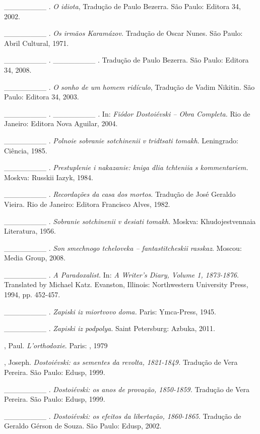 \begin{Parskip}
\_\_\_\_\_\_\_\_ . \emph{O idiota}, Tradução de Paulo Bezerra. São
Paulo: Editora 34, 2002.

\_\_\_\_\_\_\_\_ . \emph{Os irmãos Karamázov}. Tradução de Oscar Nunes.
São Paulo: Abril Cultural, 1971.

\_\_\_\_\_\_\_\_ . \_\_\_\_\_\_\_\_ . Tradução de Paulo Bezerra. São
Paulo: Editora 34, 2008.

\_\_\_\_\_\_\_\_ . \emph{O sonho de um homem ridículo}, Tradução de
Vadim Nikitin. São Paulo: Editora 34, 2003.

\_\_\_\_\_\_\_\_ . \_\_\_\_\_\_\_\_ \emph{.} In: \emph{Fiódor
Dostoiévski -- Obra Completa.} Rio de Janeiro: Editora Nova Aguilar,
2004.

\_\_\_\_\_\_\_\_ . \emph{Polnoie sobranie sotchinenii v tridtsati
tomakh}. Leningrado: Ciência, 1985.

\_\_\_\_\_\_\_\_ . \emph{Prestuplenie i nakazanie: kniga dlia tchteniia
s kommentariem.} Moskva: Russkii Iazyk, 1984.

\_\_\_\_\_\_\_\_ . \emph{Recordações da casa dos mortos}. Tradução de
José Geraldo Vieira. Rio de Janeiro: Editora Francisco Alves, 1982.

\_\_\_\_\_\_\_\_ . \emph{Sobranie sotchinenii v desiati tomakh.} Moskva:
Khudojestvennaia Literatura, 1956.

\_\_\_\_\_\_\_\_ . \emph{Son smechnogo tcheloveka -- fantastitcheskii
rasskaz}. Moscou:  Media Group, 2008.

\_\_\_\_\_\_\_\_ . \emph{A Paradoxalist.} In: \emph{A Writer's Diary,
Volume 1, 1873-1876}. Translated by Michael Katz. Evanston, Illinois:
Northwestern University Press, 1994, pp. 452-457.

\_\_\_\_\_\_\_\_ . \emph{Zapiski iz miortvovo doma.} Paris: Ymca-Press,
1945.

\_\_\_\_\_\_\_\_ . \emph{Zapiski iz podpolya.} Saint Petersburg: Azbuka,
2011.

, Paul. \emph{L'orthodoxie}. Paris: , 1979

, Joseph. \emph{Dostoiévski: as sementes da revolta, 1821-1849.}
Tradução de Vera Pereira. São Paulo: Edusp, 1999.

\_\_\_\_\_\_\_\_ . \emph{Dostoiévski: os anos de provação, 1850-1859.}
Tradução de Vera Pereira. São Paulo: Edusp, 1999.

\_\_\_\_\_\_\_\_ . \emph{Dostoiévski: os efeitos da libertação,
1860-1865}. Tradução de Geraldo Gérson de Souza. São Paulo: Edusp, 2002.


\end{Parskip}
